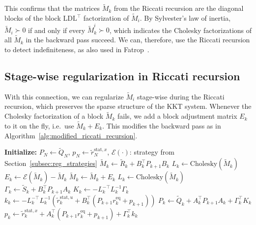 \documentclass[class=scrbook, crop=false]{standalone}
\begin{document}
This confirms that the matrices $\tilde{M}_k$ from the Riccati recursion are the diagonal blocks
of the block $\mathrm{LD}\mathrm{L}^\top$ factorization of $\tilde{M}_i$.
By Sylvester's law of inertia, $\tilde{M}_i \succ 0$ if and only if every $\tilde{M}_k^i \succ 0$,
which indicates the Cholesky factorizations of all $\tilde{M}_k$ in the backward pass succeed.
We can, therefore, use the Riccati recursion to detect indefiniteness, as also used in Fatrop~\cite{vanroye2023fatrop}.

\subsection{Stage-wise regularization in Riccati recursion}
\label{subsec:stage_regularization}
With this connection, we can regularize $\tilde{M}_i$ stage-wise during the Riccati recursion,
which preserves the sparse structure of the \gls{KKT} system.
Whenever the Cholesky factorization of a block $\tilde{M}_k$ fails,
we add a block adjustment matrix $E_k$ to it on the fly, i.e.\ use $\tilde{M}_k + E_k$.
This modifies the backward pass as in Algorithm~\ref{alg:modified_riccati_recursion}.

\begin{algorithm}[htbp]
\caption{Backward pass of modified Riccati recursion}
\label{alg:modified_riccati_recursion}
\begin{algorithmic}[1]
\State\textbf{Initialize:} $P_N \gets \tilde{Q}_N$, $p_N \gets \tilde{r}_N^{\mathrm{stat}, x}$, $\mathcal{E}(\cdot)$: strategy from Section~\ref{subsec:reg_strategies}
\Statex 
{}
    \State $\tilde{M}_k \gets \tilde{R}_k + B_k^\top P_{k+1} B_k$
    \State $L_k \gets \mathrm{Cholesky}(\tilde{M}_k)$
        \State $E_k \gets \mathcal{E}(\tilde{M}_k) - \tilde{M}_k$ 
        \State $\tilde{M}_k \gets \tilde{M}_k + E_k$ 
        \State $L_k \gets \mathrm{Cholesky}(\tilde{M}_k)$
    \EndIf
    \State $\Gamma_k \gets \tilde{S}_k + B_k^\top P_{k+1} A_k$
    \Statex
    \State $K_k \gets -L_k^{-\top} L_k^{-1} \Gamma_k$
    \State $k_k \gets -L_k^{-\top} L_k^{-1} \left(\tilde{r}_k^{\mathrm{stat}, u} + B_k^\top (P_{k+1} r_k^{\mathrm{eq}} + p_{k+1})\right)$
    \Statex
    \State $P_k \gets \tilde{Q}_k + A_k^\top P_{k+1} A_k + \Gamma_k^\top K_k$
    \State $p_k \gets \tilde{r}_k^{\mathrm{stat}, x} + A_k^\top (P_{k+1} r_k^{\mathrm{eq}} + p_{k+1}) + \Gamma_k^\top k_k$
\EndFor
\end{algorithmic}
\end{algorithm}
\end{document}
